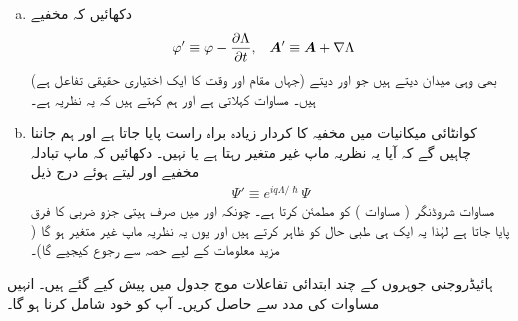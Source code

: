 \begin{enumerate}[a.]
\item 
 دکھائیں کہ مخفیے
\begin{align}\label{مساوات_تین_ابعادی_گیج_تبادلہ}
 \varphi' &\equiv\varphi-\frac{\partial\Lambda}{\partial t}, && {{\boldsymbol{A}}}' \equiv{\ensuremath{{\boldsymbol{A}}}}+\nabla\Lambda
\end{align}
(جہاں  مقام اور وقت کا ایک اختیاری حقیقی تفاعل ہے) بھی وہی میدان دیتے ہیں جو  اور  دیتے ہیں۔
 مساوات  کہلاتی ہے اور ہم کہتے ہیں کہ یہ نظریہ  ہے۔
\item
 کوانٹائی میکانیات میں مخفیہ کا کردار زیادہ براہ راست پایا جاتا ہے اور ہم جاننا چاہیں گے کہ آیا یہ نظریہ ماپ غیر متغیر رہتا ہے یا نہیں۔ دکھائیں کہ ماپ تبادلہ مخفیے  اور  لیتے ہوئے درج ذیل 
\begin{align}
 \Psi'\equiv e^{i q \Lambda/\hslash}\Psi
\end{align}
مساوات شروڈنگر ( مساوات ) کو مطمئن کرتا ہے۔ چونکہ  اور  میں صرف ہیتی جزو ضربی کا فرق پایا جاتا ہے لہٰذا یہ ایک ہی طبی حال کو ظاہر کرتے ہیں اور یوں یہ نظریہ ماپ غیر متغیر ہو گا ( مزید معلومات کے لیے حصہ سے رجوع کیجیے گا)۔
\end{enumerate}
ہائیڈروجنی جوہروں  کے چند ابتدائی تفاعلات موج جدول  میں پیش کیے گئے ہیں۔ انہیں مساوات  کی مدد سے حاصل کریں۔ آپ کو  خود شامل کرنا ہو گا۔
